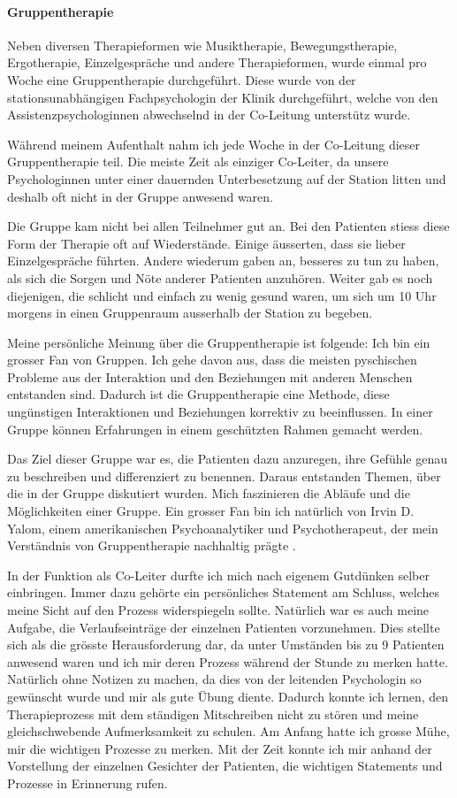 \paragraph{Gruppentherapie}
Neben diversen Therapieformen wie Musiktherapie, Bewegungstherapie, Ergotherapie, Einzelgespräche und andere Therapieformen, wurde einmal pro Woche eine Gruppentherapie durchgeführt. Diese wurde von der stationsunabhängigen Fachpsychologin der Klinik durchgeführt, welche von den Assistenzpsychologinnen abwechselnd in der Co-Leitung unterstütz wurde. 

Während meinem Aufenthalt nahm ich jede Woche in der Co-Leitung dieser Gruppentherapie teil. Die meiste Zeit als einziger Co-Leiter, da unsere Psychologinnen unter einer dauernden Unterbesetzung auf der Station litten und deshalb oft nicht in der Gruppe anwesend waren. 

Die Gruppe kam nicht bei allen Teilnehmer gut an. Bei den Patienten stiess diese Form der Therapie oft auf Wiederstände. Einige äusserten, dass sie lieber Einzelgespräche führten. Andere wiederum gaben an, besseres zu tun zu haben, als sich die Sorgen und Nöte anderer Patienten anzuhören. Weiter gab es noch diejenigen, die schlicht und einfach zu wenig gesund waren, um sich um 10 Uhr morgens in einen Gruppenraum ausserhalb der Station zu begeben.

Meine persönliche Meinung über die Gruppentherapie ist folgende: Ich bin ein grosser Fan von Gruppen. Ich gehe davon aus, dass die meisten pyschischen Probleme aus der Interaktion und den Beziehungen mit anderen Menschen entstanden sind. Dadurch ist die Gruppentherapie eine Methode, diese ungünstigen Interaktionen und Beziehungen korrektiv zu beeinflussen. In einer Gruppe können Erfahrungen in einem geschützten Rahmen gemacht werden.

Das Ziel dieser Gruppe war es, die Patienten dazu anzuregen, ihre Gefühle genau zu beschreiben und differenziert zu benennen. Daraus entstanden Themen, über die in der Gruppe diskutiert wurden. Mich faszinieren die Abläufe und die Möglichkeiten einer Gruppe. Ein grosser Fan bin ich natürlich von Irvin D. Yalom, einem amerikanischen Psychoanalytiker und Psychotherapeut, der mein Verständnis von Gruppentherapie nachhaltig prägte \cite{Yalom2010}.

In der Funktion als Co-Leiter durfte ich mich nach eigenem Gutdünken selber einbringen. Immer dazu gehörte ein persönliches Statement am Schluss, welches meine Sicht auf den Prozess widerspiegeln sollte. Natürlich war es auch meine Aufgabe, die Verlaufseinträge der einzelnen Patienten vorzunehmen. Dies stellte sich als die grösste Herausforderung dar, da unter Umständen bis zu 9 Patienten anwesend waren und ich mir deren Prozess während der Stunde zu merken hatte. Natürlich ohne Notizen zu machen, da dies von der leitenden Psychologin so gewünscht wurde und mir als gute Übung diente. Dadurch konnte ich lernen, den Therapieprozess mit dem ständigen Mitschreiben nicht zu stören und meine gleichschwebende Aufmerksamkeit zu schulen. Am Anfang hatte ich grosse Mühe, mir die wichtigen Prozesse zu merken. Mit der Zeit konnte ich mir anhand der Vorstellung der einzelnen Gesichter der Patienten, die wichtigen Statements und Prozesse in Erinnerung rufen. 

